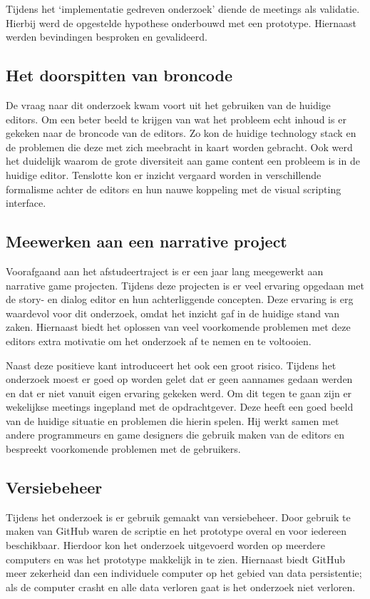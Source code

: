 Tijdens het ‘implementatie gedreven onderzoek’ diende de meetings als validatie. Hierbij werd de opgestelde hypothese onderbouwd met een prototype. Hiernaast werden bevindingen besproken en gevalideerd.

\subsection{Het doorspitten van broncode}
De vraag naar dit onderzoek kwam voort uit het gebruiken van de huidige editors. Om een beter beeld te krijgen van wat het probleem echt inhoud is er gekeken naar de broncode van de editors. Zo kon de huidige technology stack en de problemen die deze met zich meebracht in kaart worden gebracht. Ook werd het duidelijk waarom de grote diversiteit aan game content een probleem is in de huidige editor. Tenslotte kon er inzicht vergaard worden in verschillende formalisme achter de editors en hun nauwe koppeling met de visual scripting interface.

\subsection{Meewerken aan een narrative project}
Voorafgaand aan het afstudeertraject is er een jaar lang meegewerkt aan narrative game projecten. Tijdens deze projecten is er veel ervaring opgedaan met de story- en dialog editor en hun achterliggende concepten. Deze ervaring is erg waardevol voor dit onderzoek, omdat het inzicht gaf in de huidige stand van zaken. Hiernaast biedt het oplossen van veel voorkomende problemen met deze editors extra motivatie om het onderzoek af te nemen en te voltooien.

Naast deze positieve kant introduceert het ook een groot risico. Tijdens het onderzoek moest er goed op worden gelet dat er geen aannames gedaan werden en dat er niet vanuit eigen ervaring gekeken werd. Om dit tegen te gaan zijn er wekelijkse meetings ingepland met de opdrachtgever. Deze heeft een goed beeld van de huidige situatie en problemen die hierin spelen. Hij werkt samen met andere programmeurs en game designers die gebruik maken van de editors en bespreekt voorkomende problemen met de gebruikers.

\subsection{Versiebeheer}
Tijdens het onderzoek is er gebruik gemaakt van versiebeheer. Door gebruik te maken van GitHub waren de scriptie en het prototype overal en voor iedereen beschikbaar. Hierdoor kon het onderzoek uitgevoerd worden op meerdere computers en was het prototype makkelijk in te zien. Hiernaast biedt GitHub meer zekerheid dan een individuele computer op het gebied van data persistentie; als de computer crasht en alle data verloren gaat is het onderzoek niet verloren.

